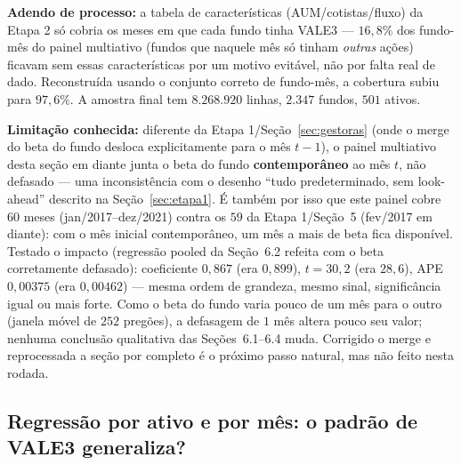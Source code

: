 \documentclass[11pt,a4paper]{article}
\begin{document}
\textbf{Adendo de processo:} a tabela de características (AUM/cotistas/fluxo) da Etapa 2 só
cobria os meses em que cada fundo tinha VALE3 --- $16{,}8\%$ dos fundo-mês do painel multiativo
(fundos que naquele mês só tinham \emph{outras} ações) ficavam sem essas características por um
motivo evitável, não por falta real de dado. Reconstruída usando o conjunto correto de
fundo-mês, a cobertura subiu para $97{,}6\%$. A amostra final tem $8.268.920$ linhas, $2.347$
fundos, $501$ ativos.

\textbf{Limitação conhecida:} diferente da Etapa 1/Seção~\ref{sec:gestoras} (onde o merge do beta
do fundo desloca explicitamente para o mês $t-1$), o painel multiativo desta seção em diante junta
o beta do fundo \textbf{contemporâneo} ao mês $t$, não defasado --- uma inconsistência com o
desenho ``tudo predeterminado, sem look-ahead'' descrito na Seção~\ref{sec:etapa1}. É também por
isso que este painel cobre $60$ meses (jan/2017--dez/2021) contra os $59$ da Etapa 1/Seção~5
(fev/2017 em diante): com o mês inicial contemporâneo, um mês a mais de beta fica disponível.
Testado o impacto (regressão pooled da Seção~6.2 refeita com o beta corretamente defasado):
coeficiente $0{,}867$ (era $0{,}899$), $t=30{,}2$ (era $28{,}6$), APE $0{,}00375$ (era $0{,}00462$)
--- mesma ordem de grandeza, mesmo sinal, significância igual ou mais forte. Como o beta do fundo
varia pouco de um mês para o outro (janela móvel de $252$ pregões), a defasagem de $1$ mês altera
pouco seu valor; nenhuma conclusão qualitativa das Seções~6.1--6.4 muda. Corrigido o merge e
reprocessada a seção por completo é o próximo passo natural, mas não feito nesta rodada.

\subsection{Regressão por ativo e por mês: o padrão de VALE3 generaliza?}
\end{document}
